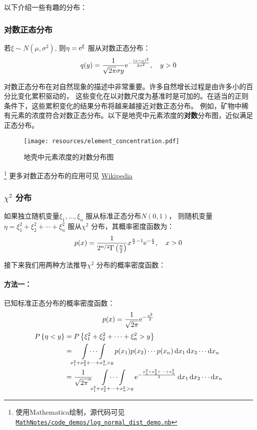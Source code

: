 以下介绍一些有趣的分布：

\subsubsection{对数正态分布}
若\(\xi\sim N(\mu,\sigma^{2})\), 则\(\eta=\mathrm{e}^{\xi} \) 服从对数正态分布：
\[
    q(y) = \frac{1}{\sqrt{2\pi}\sigma y}
    \mathrm{e}^{-\frac{(x-\mu)^{2}}{2\sigma^{2}}},\quad y>0
\]

对数正态分布在对自然现象的描述中非常重要。许多自然增长过程是由许多小的百分比变化累积驱动的，
这些变化在以对数尺度为基准时是可加的。在适当的正则条件下，这些累积变化的结果分布将越来越接近对数正态分布。
例如，矿物中稀有元素的浓度符合对数正态分布。以下是地壳中元素浓度的\textbf{对数}分布图，近似满足正态分布。
\begin{figure}[H]
    \centering
    \texttt{[image: resources/element\_concentration.pdf]}
    \caption{地壳中元素浓度的对数分布图}
    \label{fig:lognormal}
\end{figure}\footnote{使用Mathematica绘制，源代码可见
\href{https://github.com/Sazzzzzz/MathNotes/blob/main/code_demos/log_normal_dist_demo.nb}{\texttt{MathNotes/code_demos/log_normal_dist_demo.nb}}}
更多对数正态分布的应用可见
\href{https://en.wikipedia.org/wiki/Log-normal_distribution#Occurrence_and_applications}{Wikipedia}

\subsubsection{\(\chi^{2}\) 分布}
如果独立随机变量\(\xi_{1}, \dots ,\xi_{n}\) 服从标准正态分布\(N(0,1)\)，
则随机变量\(\eta = \xi_{1}^{2} + \xi_{2}^{2} + \cdots +
\xi_{n}^{2}\) 服从\(\chi^{2}\) 分布，其概率密度函数为：
\[
    p(x) = \frac{1}{2^{n/2} \Gamma\left(\frac{n}{2}\right)} x^{\frac{n}{2}-1}
    \mathrm{e}^{-\frac{x}{2}}, \quad x>0
\]

接下来我们用两种方法推导\(\chi^{2}\) 分布的概率密度函数：
\paragraph{方法一：}
已知标准正态分布的概率密度函数：\[
    p(x) = \frac{1}{\sqrt{2\pi}} \mathrm{e}^{-\frac{x^{2}}{2}}
\]
\begin{align*}
    \P{\eta<y} &= \P{\xi_{1}^{2} + \xi_{2}^{2} + \cdots +
    \xi_{n}^{2} > y} \\
    &= \idotsint\limits_{x_{1}^{2} + x_{2}^{2} + \cdots +
    x_{n}^{2} > y} p(x_{1}) p(x_{2}) \cdots p(x_{n}) \d{x}_{1}
    \d{x}_{2} \cdots \d{x}_{n} \\
    &= \frac{1}{\sqrt{2\pi}^{n}}
    \idotsint\limits_{x_{1}^{2} + x_{2}^{2} + \cdots + x_{n}^{2} > y}
    \e^{-\frac{x_{1}^{2}+ x_{2}^{2} +\dots + x_{n}^{2}}{2}}
    \d{x}_{1} \d{x}_{2} \cdots \d{x}_{n} \\
\end{align*}

